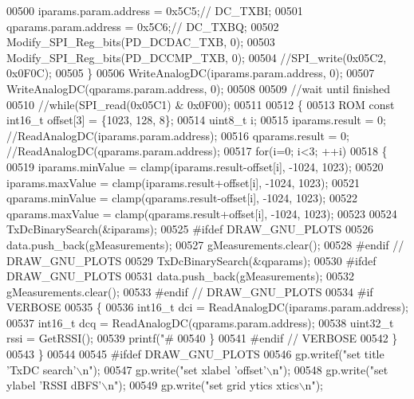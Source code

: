 \begin{DoxyCode}
{{{{{{{{{{00500         iparams.param.address = 0x5C5;\textcolor{comment}{// DC\_TXBI;}
00501         qparams.param.address = 0x5C6;\textcolor{comment}{// DC\_TXBQ;}
00502         Modify_SPI_Reg_bits(PD_DCDAC_TXB, 0);
00503         Modify_SPI_Reg_bits(PD_DCCMP_TXB, 0);
00504         \textcolor{comment}{//SPI\_write(0x05C2, 0x0F0C);}
00505     \}
00506     WriteAnalogDC(iparams.param.address, 0);
00507     WriteAnalogDC(qparams.param.address, 0);
00508 
00509     \textcolor{comment}{//wait until finished}
00510     \textcolor{comment}{//while(SPI\_read(0x05C1) & 0x0F00);}
00511 
00512     \{
00513     ROM \textcolor{keyword}{const} int16\_t offset[3] = \{1023, 128, 8\};
00514     uint8\_t i;
00515     iparams.result = 0; \textcolor{comment}{//ReadAnalogDC(iparams.param.address);}
00516     qparams.result = 0; \textcolor{comment}{//ReadAnalogDC(qparams.param.address);}
00517     \textcolor{keywordflow}{for}(i=0; i<3; ++i)
00518     \{
00519         iparams.minValue = clamp(iparams.result-offset[i], -1024, 1023);
00520         iparams.maxValue = clamp(iparams.result+offset[i], -1024, 1023);
00521         qparams.minValue = clamp(qparams.result-offset[i], -1024, 1023);
00522         qparams.maxValue = clamp(qparams.result+offset[i], -1024, 1023);
00523 
00524         TxDcBinarySearch(&iparams);
00525 \textcolor{preprocessor}{#ifdef DRAW\_GNU\_PLOTS}
00526         data.push\_back(gMeasurements);
00527         gMeasurements.clear();
00528 \textcolor{preprocessor}{#endif // DRAW\_GNU\_PLOTS}
00529         TxDcBinarySearch(&qparams);
00530 \textcolor{preprocessor}{#ifdef DRAW\_GNU\_PLOTS}
00531         data.push\_back(gMeasurements);
00532         gMeasurements.clear();
00533 \textcolor{preprocessor}{#endif // DRAW\_GNU\_PLOTS}
00534 \textcolor{preprocessor}{#if VERBOSE}
00535     \{
00536         int16\_t dci = ReadAnalogDC(iparams.param.address);
00537         int16\_t dcq = ReadAnalogDC(qparams.param.address);
00538         uint32\_t rssi = GetRSSI();
00539         printf(\textcolor{stringliteral}{"#%
00540     \}
00541 \textcolor{preprocessor}{#endif // VERBOSE}
00542     \}
00543     \}
00544 
00545 \textcolor{preprocessor}{#ifdef DRAW\_GNU\_PLOTS}
00546     gp.writef(\textcolor{stringliteral}{"set title 'TxDC search'\(\backslash\)n"});
00547     gp.write(\textcolor{stringliteral}{"set xlabel 'offset'\(\backslash\)n"});
00548     gp.write(\textcolor{stringliteral}{"set ylabel 'RSSI dBFS'\(\backslash\)n"});
00549     gp.write(\textcolor{stringliteral}{"set grid ytics xtics\(\backslash\)n"});
}}}}}}}}}}}
\end{DoxyCode}
